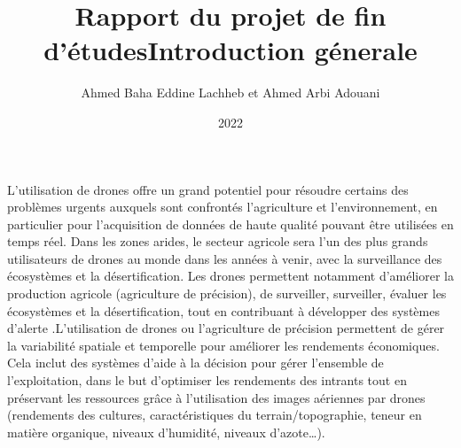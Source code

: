 \documentclass[a4paper,12pt]{report}
\title{Rapport du projet de fin d'études}
\author{Ahmed Baha Eddine Lachheb et Ahmed Arbi Adouani}
\date{2022}
\begin{document}
	\title {Introduction génerale}
	
	L'utilisation de drones offre un grand potentiel pour résoudre certains des problèmes urgents auxquels sont confrontés l'agriculture et l'environnement, en particulier pour l'acquisition de données de haute qualité pouvant être utilisées en temps réel. Dans les zones arides, le secteur agricole sera l'un des plus grands utilisateurs de drones au monde dans les années à venir, avec la surveillance des écosystèmes et la désertification. Les drones permettent notamment d'améliorer la production agricole (agriculture de précision), de surveiller, surveiller, évaluer les écosystèmes et la désertification, tout en contribuant à développer des systèmes d'alerte .L'utilisation de drones ou l'agriculture de précision permettent de gérer la variabilité spatiale et temporelle pour améliorer les rendements économiques. Cela inclut des systèmes d'aide à la décision pour gérer l'ensemble de l'exploitation,  dans le but d’optimiser les rendements des intrants tout en préservant les ressources grâce à l’utilisation des images aériennes par drones (rendements des cultures, caractéristiques du terrain/topographie, teneur en matière organique, niveaux d’humidité, niveaux d’azote…).
	
	
	
	
	
	
	
	
\end{document}
